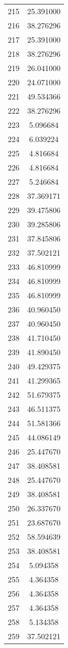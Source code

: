 \documentclass[12pt]{article}
\begin{document}
\begin{longtable}{@{}cc@{}}
215 & 25.391000 \\
216 & 38.276296 \\
217 & 25.391000 \\
218 & 38.276296 \\
219 & 26.041000 \\
220 & 24.071000 \\
221 & 49.534366 \\
222 & 38.276296 \\
223 & 5.096684 \\
224 & 6.039224 \\
225 & 4.816684 \\
226 & 4.816684 \\
227 & 5.246684 \\
228 & 37.369171 \\
229 & 39.475806 \\
230 & 39.285806 \\
231 & 37.845806 \\
232 & 37.502121 \\
233 & 46.810999 \\
234 & 46.810999 \\
235 & 46.810999 \\
236 & 40.960450 \\
237 & 40.960450 \\
238 & 41.710450 \\
239 & 41.890450 \\
240 & 49.429375 \\
241 & 41.299365 \\
242 & 51.679375 \\
243 & 46.511375 \\
244 & 51.581366 \\
245 & 44.086149 \\
246 & 25.447670 \\
247 & 38.408581 \\
248 & 25.447670 \\
249 & 38.408581 \\
250 & 26.337670 \\
251 & 23.687670 \\
252 & 58.594639 \\
253 & 38.408581 \\
254 & 5.094358 \\
255 & 4.364358 \\
256 & 4.364358 \\
257 & 4.364358 \\
258 & 5.134358 \\
259 & 37.502121 \\

\end{longtable}
\end{document}
